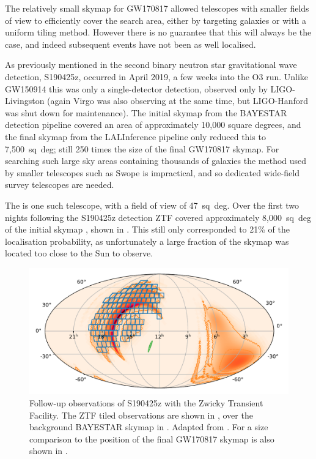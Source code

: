 \begin{colsection}
\begin{colsection}
The relatively small skymap for GW170817 allowed telescopes with smaller fields of view to efficiently cover the search area, either by targeting galaxies or with a uniform tiling method. However there is no guarantee that this will always be the case, and indeed subsequent events have not been as well localised.

As previously mentioned in  the second binary neutron star gravitational wave detection, S190425z, occurred in April 2019, a few weeks into the O3 run. Unlike GW150914 this was only a single-detector detection, observed only by LIGO-Livingston (again Virgo was also observing at the same time, but LIGO-Hanford was shut down for maintenance). The initial skymap from the BAYESTAR detection pipeline covered an area of approximately 10,000 square degrees, and the final skymap from the LALInference pipeline only reduced this to 7,500~sq~deg; still 250 times the size of the final GW170817 skymap. For searching such large sky areas containing thousands of galaxies the method used by smaller telescopes such as Swope is impractical, and so dedicated wide-field survey telescopes are needed.

The  is one such telescope, with a field of view of 47~sq~deg. Over the first two nights following the S190425z detection ZTF covered approximately 8,000~sq~deg of the initial skymap \citep{GW190425_ZTF}, shown in . This still only corresponded to 21\% of the localisation probability, as unfortunately a large fraction of the skymap was located too close to the Sun to observe.

\newpage

\begin{figure}[t]
    \begin{center}
        \includegraphics[width=0.9\linewidth]{images/190425_ztf.pdf}
    \end{center}
    \caption[Follow-up observations of S190425z with ZTF]{
        Follow-up observations of S190425z with the Zwicky Transient Facility. The ZTF tiled observations are shown in , over the background BAYESTAR skymap in . Adapted from \citet{GW190425_ZTF}. For a size comparison to  the position of the final GW170817 skymap is also shown in .
        }\label{fig:ztf}
\end{figure}


\end{colsection}
\end{colsection}
